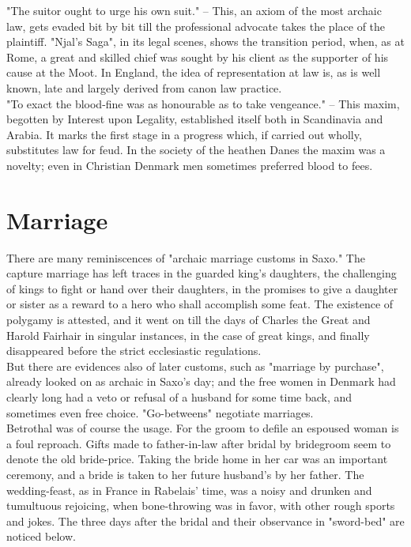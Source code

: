 \documentclass[10pt,a4paper]{report}
\begin{document}
"The suitor ought to urge his own suit." -- This, an axiom of the most archaic law, gets evaded bit by bit till the professional advocate takes the place of the plaintiff. "Njal's Saga", in its legal scenes, shows the transition period, when, as at Rome, a great and skilled chief was sought by his client as the supporter of his cause at the Moot. In England, the idea of representation at law is, as is well known, late and largely derived from canon law practice.\\

"To exact the blood-fine was as honourable as to take vengeance." -- This maxim, begotten by Interest upon Legality, established itself both in Scandinavia and Arabia. It marks the first stage in a progress which, if carried out wholly, substitutes law for feud. In the society of the heathen Danes the maxim was a novelty; even in Christian Denmark men sometimes preferred blood to fees.\\

\section{Marriage}
There are many reminiscences of "archaic marriage customs in Saxo." The capture marriage has left traces in the guarded king's daughters, the challenging of kings to fight or hand over their daughters, in the promises to give a daughter or sister as a reward to a hero who shall accomplish some feat. The existence of polygamy is attested, and it went on till the days of Charles the Great and Harold Fairhair in singular instances, in the case of great kings, and finally disappeared before the strict ecclesiastic regulations.\\

But there are evidences also of later customs, such as "marriage by purchase", already looked on as archaic in Saxo's day; and the free women in Denmark had clearly long had a veto or refusal of a husband for some time back, and sometimes even free choice. "Go-betweens" negotiate marriages.\\

Betrothal was of course the usage. For the groom to defile an espoused woman is a foul reproach. Gifts made to father-in-law after bridal by bridegroom seem to denote the old bride-price. Taking the bride home in her car was an important ceremony, and a bride is taken to her future husband's by her father. The wedding-feast, as in France in Rabelais' time, was a noisy and drunken and tumultuous rejoicing, when bone-throwing was in favor, with other rough sports and jokes. The three days after the bridal and their observance in "sword-bed" are noticed below.\\
\end{document}
